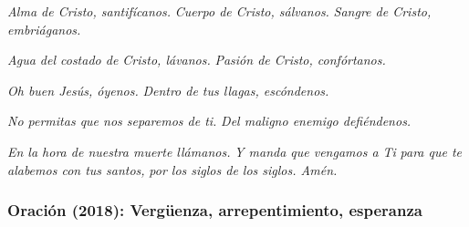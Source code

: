 \begin{body}
\begin{bodyprose}
\textit{Alma de Cristo, santifícanos.}
\textit{Cuerpo de Cristo, sálvanos.}
\textit{Sangre de Cristo, embriáganos.}

\textit{Agua del costado de Cristo, lávanos.}
\textit{Pasión de Cristo, confórtanos.}

\textit{Oh buen Jesús, óyenos.}
\textit{Dentro de tus llagas, escóndenos.}

\textit{No permitas que nos separemos de ti.}
\textit{Del maligno enemigo defiéndenos.}

\textit{En la hora de nuestra muerte llámanos.}
\textit{Y manda que vengamos a Ti} 
\textit{para que te alabemos con tus santos,}
\textit{por los siglos de los siglos. Amén.}
\end{bodyprose}
\end{body}



\newpage 
\subsubsection{Oración (2018): Vergüenza, arrepentimiento, esperanza}


